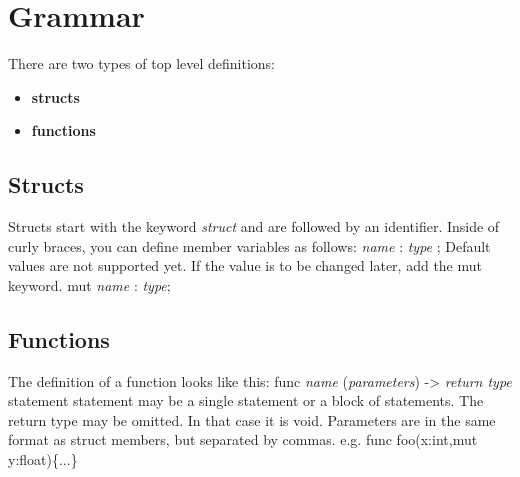 \documentclass[main.tex]{subfiles}
\begin{document}
    \chapter{Grammar}
    There are two types of top level definitions:
    \begin{itemize}
        \item \textbf{structs}
        \item \textbf{functions}
    \end{itemize}
    \section{Structs}
        Structs start with the keyword \textit{struct} and are followed by an identifier.
        Inside of curly braces, you can define member variables as follows:
        \textit{name} : \textit{type} ;
        Default values are not supported yet.
        If the value is to be changed later, add the mut keyword.
        mut \textit{name} : \textit{type};
    \section{Functions}
    The definition of a function looks like this:
    func \textit{name} (\textit{parameters}) -> \textit{return type} statement
    statement may be a single statement or a block of statements.
    The return type may be omitted. In that case it is void.
    Parameters are in the same format as struct members, but separated by commas.
    e.g. func foo(x:int,mut y:float)\{...\}
    
\end{document}
